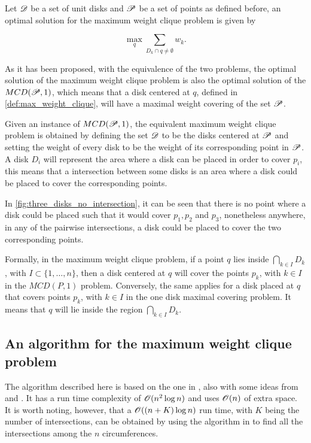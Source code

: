\begin{definicao}\label{def:max_weight_clique}
    Let $\mathscr{D}$ be a set of unit disks and $\mathscr{P}$ be a set of points as defined before, an optimal solution for the maximum weight clique problem is given by 
    
    \begin{equation}
        \max_q \sum_{D_k \cap q \neq \emptyset} w_k.
    \end{equation}

\end{definicao}

As it has been proposed, with the equivalence of the two problems, the optimal solution of the maximum weight clique problem is also the optimal solution of the $MCD(\mathscr{P},1)$, which means that a disk centered at $q$, defined in \autoref{def:max_weight_clique}, will have a maximal weight covering of the set $\mathscr{P}$.

Given an instance of $MCD(\mathscr{P},1)$, the equivalent maximum weight clique problem is obtained by defining the set $\mathscr{D}$ to be the disks centered at $\mathscr{P}$ and setting the weight of every disk to be the weight of its corresponding point in $\mathscr{P}$. A disk $D_i$ will represent the area where a disk can be placed in order to cover $p_i$, this means that a intersection between some disks is an area where a disk could be placed to cover the corresponding points.

In \autoref{fig:three_disks_no_intersection}, it can be seen that there is no point where a disk could be placed such that it would cover $p_1, p_2$ and $p_3$, nonetheless anywhere, in any of the pairwise intersections, a disk could be placed to cover the two corresponding points.

Formally, in the maximum weight clique problem, if a point $q$ lies inside $\bigcap_{k \in I} D_k$, with $I \subset \{1,\dots,n\}$, then a disk centered at $q$ will cover the points $p_k$, with $k\in I$ in the $MCD(P,1)$ problem. Conversely, the same applies for a disk placed at $q$ that covers points $p_k$, with $k \in I$ in the one disk maximal covering problem. It means that $q$ will lie inside the region $\bigcap_{k \in I} D_k$.

\subsection{An algorithm for the maximum weight clique problem}

The algorithm described here is based on the one in \cite{drezner}, also with some ideas from \cite{inplace:2014} and \cite{cabello:2006}. It has a run time complexity of $\mathscr{O}(n^2\log{n})$ and uses $\mathscr{O}(n)$ of extra space. It is worth noting, however, that a $\mathscr{O}((n+K)\log{n})$ run time, with $K$ being the number of intersections, can be obtained by using the algorithm in \cite{bentley:1979} to find all the intersections among the $n$ circumferences.

